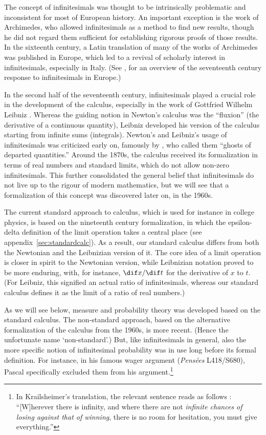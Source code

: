 The concept of infinitesimals was thought to be intrinsically problematic and inconsistent for most of European history. An important exception is the work of Archimedes, who allowed infinitesimals as a method to find new results, though he did not regard them sufficient for establishing rigorous proofs of those results. In the sixteenth century, a Latin translation of many of the works of Archimedes was published in Europe, which led to a revival of scholarly interest in infinitesimals, especially in Italy. (See \citealp{Alexander:2014}, for an overview of the seventeenth century response to infinitesimals in Europe.)

In the second half of the seventeenth century, infinitesimals played a crucial role in the development of the calculus, especially in the work of Gottfried Wilhelm Leibniz \citep[see, \textit{e.g.},][]{KatzSherry:2012a,KatzSherry:2013}.
Whereas the guiding notion in Newton's calculus was the ``fluxion'' (the derivative of a continuous quantity), Leibniz developed his version of the calculus starting from infinite sums (integrals). Newton's and Leibniz's usage of infinitesimals was criticized early on, famously by \citet{Berkeley:1734}, who called them ``ghosts of departed quantities.''
Around the 1870s, the calculus received its formalization in terms of real numbers and standard limits, which do not allow non-zero infinitesimals. This further consolidated the general belief that infinitesimals do not live up to the rigour of modern mathematics, but we will see that a formalization of this concept was discovered later on, in the 1960s.

The current standard approach to calculus, which is used for instance in college physics, is based on the nineteenth century formalization, in which the epsilon-delta definition of the limit operation takes a central place (see appendix~\ref{sec:standardcalc}). As a result, our standard calculus differs from both the Newtonian and the Leibnizian version of it. The core idea of a limit operation is closer in spirit to the Newtonian version, while Leibnizian notation proved to be more enduring, with, for instance, $\dif x/\dif t$ for the derivative of $x$ to $t$. (For Leibniz, this signified an actual ratio of infinitesimals, whereas our standard calculus defines it as the limit of a ratio of real numbers.)

As we will see below, measure and probability theory was developed based on the standard calculus. The non-standard approach, based on the alternative formalization of the calculus from the 1960s, is more recent. (Hence the unfortunate name `non-standard'.) But, like infinitesimals in general, also the more specific notion of infinitesimal probability was in use long before its formal definition. For instance, in his famous wager argument (\textit{Pens{\'{e}}es} L418/S680), Pascal specifically excluded them from his argument.\footnote{In Krailsheimer's translation, the relevant sentence reads as follows \citep[p.~151, my emphasis]{Krailsheimer:1995}: ``[W]herever there is infinity, and where there are not \emph{infinite chances of losing against that of winning}, there is no room for hesitation, you must give everything.''}

